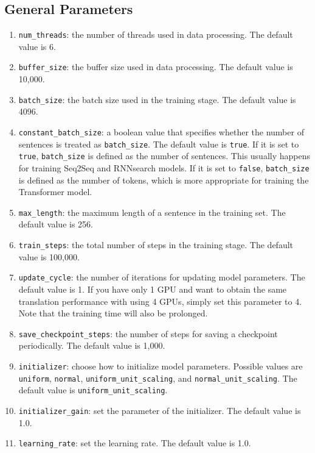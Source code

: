 \documentclass{article}
\begin{document}
\subsection{General Parameters}
\begin{enumerate}
\item \verb|num_threads|: the number of threads used in data processing. The default value is 6.
\item \verb|buffer_size|: the buffer size used in data processing. The default value is 10,000.
\item \verb|batch_size|: the batch size used in the training stage. The default value is 4096.
\item \verb|constant_batch_size|: a boolean value that specifies whether the number of sentences is treated as \verb|batch_size|. The default value is \verb|true|. If it is set to \verb|true|, \verb|batch_size| is defined as the number of sentences. This usually happens for training Seq2Seq and RNNsearch models. If it is set to \verb|false|, \verb|batch_size| is defined as the number of tokens, which is more appropriate for training the Transformer model.
\item \verb|max_length|: the maximum length of a sentence in the training set. The default value is 256.
\item \verb|train_steps|: the total number of steps in the training stage. The default value is 100,000.
\item \verb|update_cycle|:  the number of iterations for updating model parameters. The default value is 1. If you have only 1 GPU and want to obtain the same translation performance with using 4 GPUs, simply set this parameter to 4. Note that the training time will also be prolonged.
\item \verb|save_checkpoint_steps|: the number of steps for saving a checkpoint periodically.  The default value is 1,000.
\item \verb|initializer|: choose how to initialize model parameters. Possible values are \verb|uniform|, \verb|normal|, \verb|uniform_unit_scaling|, and \verb|normal_unit_scaling|. The default value is \verb|uniform_unit_scaling|.
\item \verb|initializer_gain|: set the parameter of the initializer. The default value is 1.0.
\item \verb|learning_rate|: set the learning rate. The default value is 1.0.

\end{enumerate}
\end{document}
